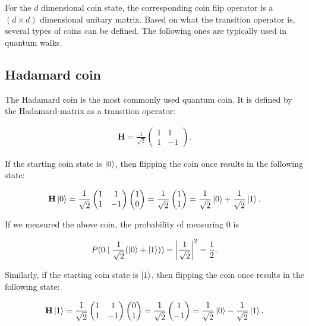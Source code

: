 For the $d$ dimensional coin state, the corresponding coin flip operator is a $(d\times{}d)$ dimensional unitary matrix. Based on what the transition operator is, several types of coins can be defined. The following ones are typically used in quantum walks.

\subsection{Hadamard coin}

The Hadamard coin is the most commonly used quantum coin. It is defined by the Hadamard-matrix as a transition operator:

\begin{align*}
  \mathbf{H} = \frac{1}{\sqrt{2}}\begin{pmatrix}
      1 & 1  \\
      1 & -1
    \end{pmatrix}.
\end{align*}

If the starting coin state is $\ket{0}$, then flipping the coin once results in the following state:

\begin{align*}
 \mathbf{H}\ket{0} = \frac{1}{\sqrt{2}}\begin{pmatrix}
      1 & 1  \\
      1 & -1
    \end{pmatrix} \begin{pmatrix} 1 \\ 0 \end{pmatrix}
    = \frac{1}{\sqrt{2}} \begin{pmatrix} 1 \\ 1 \end{pmatrix} = \frac{1}{\sqrt{2}} \ket{0} + \frac{1}{\sqrt{2}} \ket{1}.
\end{align*}

If we measured the above coin, the probability of measuring $0$ is

\begin{align*}
P(0 \mid \frac{1}{\sqrt{2}} (\ket{0} + \ket{1})) =
\left\lvert\frac{1}{\sqrt{2}}\right\rvert^2 =
\frac{1}{2}.
\end{align*}

Similarly, if the starting coin state is $\ket{1}$, then flipping the coin once results in the following state:

\begin{align*}
   \mathbf{H}\ket{1} = \frac{1}{\sqrt{2}}\begin{pmatrix}
      1 & 1  \\
      1 & -1
    \end{pmatrix} \begin{pmatrix} 0 \\ 1 \end{pmatrix}
    = \frac{1}{\sqrt{2}} \begin{pmatrix} 1 \\ -1 \end{pmatrix} = \frac{1}{\sqrt{2}} \ket{0} - \frac{1}{\sqrt{2}} \ket{1}.
\end{align*}

